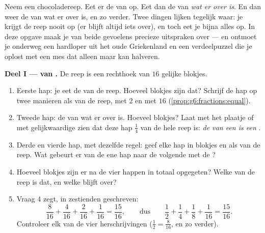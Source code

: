\begin{problem}
\label{pb:g6:fractions:1}
Neem een chocoladereep. Eet er de  van op. Eet dan de  van
\emph{wat er over is}. En dan weer de  van wat er over is, en zo verder.
Twee dingen lijken tegelijk waar: je krijgt de reep nooit op (er blijft altijd
iets over), en toch eet je bijna alles op. In deze opgave maak je van beide
gevoelens precieze uitspraken over  --- en ontmoet je onderweg een
hardloper uit het oude Griekenland en een verdeelpuzzel die je oplost met een
mes dat alleen maar kan halveren.

\medskip
\noindent\textbf{Deel I ---  van .}
De reep is een rechthoek van $16$ gelijke blokjes.
\begin{enumerate}
  \item Eerste hap: je eet de  van de reep. Hoeveel blokjes zijn dat?
        Schrijf de hap op twee manieren als  van de reep, met  $2$
        en met  $16$ (\cref{prop:g6:fractions:equal}).
  \item Tweede hap: de  van wat er over is. Hoeveel blokjes? Laat met het
        plaatje of met gelijkwaardige  zien dat deze hap $\frac14$ van
        de hele reep is: \emph{de  van een  is een }.
  \item Derde en vierde hap, met dezelfde regel: geef elke hap in blokjes en
        als  van de reep. Wat gebeurt er van de ene hap naar de volgende
        met de ?
  \item Hoeveel blokjes zijn er na de vier happen in totaal opgegeten? Welke
         van de reep is dat, en welke  blijft over?
\item Vraag 4 zegt, in zestienden geschreven:
        \[
        \frac{8}{16} + \frac{4}{16} + \frac{2}{16} + \frac{1}{16}
        = \frac{15}{16},
        \qquad\text{dus}\qquad
        \frac12 + \frac14 + \frac18 + \frac{1}{16}
        = \frac{15}{16} .
        \]
        Controleer elk van de vier herschrijvingen
        ($\frac12 = \frac{8}{16}$, en zo verder).
\end{enumerate}


\end{problem}
